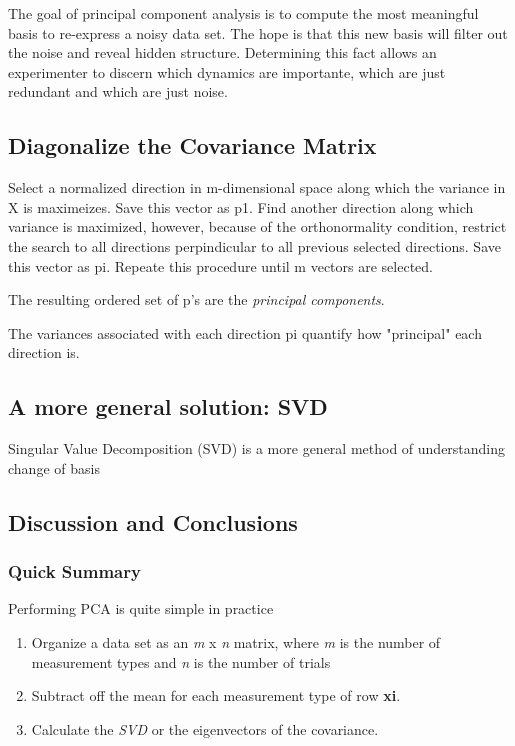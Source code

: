 The goal of principal component analysis is to compute the most
meaningful basis to re-express a noisy data set. The hope is that this
new basis will filter out the noise and reveal hidden structure.
Determining this fact allows an experimenter to discern which dynamics
are importante, which are just redundant and which are just noise.

\hypertarget{diagonalize-the-covariance-matrix}{%
\subsection{Diagonalize the Covariance
Matrix}\label{diagonalize-the-covariance-matrix}}

Select a normalized direction in m-dimensional space along which the
variance in X is maximeizes. Save this vector as p1. Find another
direction along which variance is maximized, however, because of the
orthonormality condition, restrict the search to all directions
perpindicular to all previous selected directions. Save this vector as
pi. Repeate this procedure until m vectors are selected.

The resulting ordered set of p's are the \emph{principal components}.

The variances associated with each direction pi quantify how "principal"
each direction is.

\hypertarget{a-more-general-solution-svd}{%
\subsection{A more general solution:
SVD}\label{a-more-general-solution-svd}}

Singular Value Decomposition (SVD) is a more general method of
understanding change of basis

\hypertarget{discussion-and-conclusions}{%
\subsection{Discussion and
Conclusions}\label{discussion-and-conclusions}}

\hypertarget{quick-summary}{%
\subsubsection{Quick Summary}\label{quick-summary}}

Performing PCA is quite simple in practice

\begin{enumerate}
\def\labelenumi{\arabic{enumi}.}
\item
  Organize a data set as an \emph{m} x \emph{n} matrix, where \emph{m}
  is the number of measurement types and \emph{n} is the number of
  trials
\item
  Subtract off the mean for each measurement type of row \textbf{xi}.
\item
  Calculate the \emph{SVD} or the eigenvectors of the covariance.
\end{enumerate}

